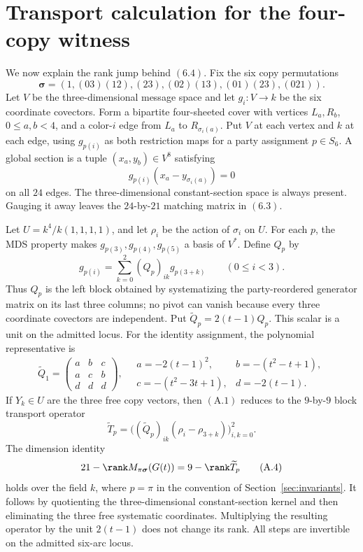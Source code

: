 \section{Transport calculation for the four-copy witness}\label{sec:transport}

We now explain the rank jump behind \((6.4)\).  Fix the six copy
permutations
\[
\boldsymbol\sigma=(1,(03)(12),(23),(02)(13),(01)(23),(021)).
\]
Let \(V\) be the three-dimensional message space and let
\(g_i:V\to k\) be the six coordinate covectors.  Form a bipartite
four-sheeted cover with vertices \(L_a,R_b\), \(0\leq a,b<4\), and a
color-\(i\) edge from \(L_a\) to \(R_{\sigma_i(a)}\).  Put \(V\) at each
vertex and \(k\) at each edge, using \(g_{p(i)}\) as both restriction
maps for a party assignment \(p\in S_6\).  A global section is a tuple
\((x_a,y_b)\in V^8\) satisfying
\[
 g_{p(i)}(x_a-y_{\sigma_i(a)})=0                       \tag{A.1}
\]
on all \(24\) edges.  The three-dimensional constant-section space is
always present.  Gauging it away leaves the \(24\)-by-\(21\) matching
matrix in \((6.3)\).

Let \(U=k^4/k(1,1,1,1)\), and let \(\rho_i\) be the action of
\(\sigma_i\) on \(U\).  For each \(p\), the MDS property makes
\(g_{p(3)},g_{p(4)},g_{p(5)}\) a basis of \(V^*\).  Define \(Q_p\) by
\[
 g_{p(i)}=\sum_{k=0}^2(Q_p)_{ik}g_{p(3+k)}
 \qquad(0\leq i<3).                                   \tag{A.2}
\]
Thus \(Q_p\) is the left block obtained by systematizing the
party-reordered generator matrix on its last three columns; no pivot can
vanish because every three coordinate covectors are independent.  Put
\(\widetilde Q_p=2(t-1)Q_p\).  This scalar is a unit on the admitted
locus.  For the identity assignment, the polynomial representative is
\[
\widetilde Q_1=\begin{pmatrix}a&b&c\\a&c&b\\d&d&d\end{pmatrix},
\quad
\begin{array}{ll}
a=-2(t-1)^2,&b=-(t^2-t+1),\\
c=-(t^2-3t+1),&d=-2(t-1).
\end{array}
\]
If \(Y_k\in U\) are the three free copy vectors, then
\((\mathrm{A}.1)\) reduces
to the \(9\)-by-\(9\) block transport operator
\[
 \widetilde T_p
 =\bigl((\widetilde Q_p)_{ik}(\rho_i-\rho_{3+k})\bigr)_{i,k=0}^2.
                                                               \tag{A.3}
\]
The dimension identity
\[
 21-\rank M_{\pi\boldsymbol\sigma}(G(t))
   =9-\rank\widetilde T_p                              \tag{A.4}
\]
holds over the field \(k\), where \(p=\pi\) in the convention of
Section~\ref{sec:invariants}.  It follows by quotienting the
three-dimensional constant-section kernel and then eliminating the three
free systematic coordinates.  Multiplying the resulting operator by
the unit \(2(t-1)\) does not change its rank.  All steps are invertible
on the admitted six-arc locus.

